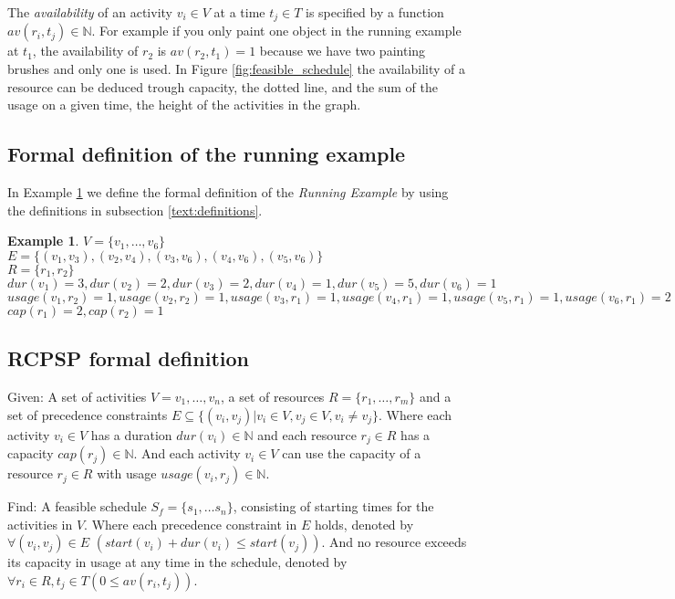\documentclass{article}
\theoremstyle{definition}
\newtheorem{example}{Example}[section]
\newcommand{\av}[2]{\ensuremath{av(r_{#1}, t_{#2})}} %
\newcommand{\capa}[1]{\ensuremath{cap(r_{#1})}} %
\newcommand{\dur}[1]{\ensuremath{dur(v_{#1})}} %
\newcommand{\usage}[2]{\ensuremath{usage(v_{#1}, r_{#2})}} %
\newcommand{\start}[1]{\ensuremath{start(v_{#1})}} %
\newenvironment{definition}[1][Definition]{\begin{trivlist}
\item[\hskip \labelsep {\bfseries #1}]}{\end{trivlist}}
\begin{document}
The \emph{availability} of an activity $v_i \in V$ at a time $t_j \in T$ is specified by a function $\av{i}{j} \in \mathbb{N}$.
For example if you only paint one object in the running example at $t_1$, the availability of $r_2$ is $\av{2}{1} = 1$ because we have two painting brushes and only one is used.
In Figure \ref{fig:feasible_schedule} the availability of a resource can be deduced trough capacity, the dotted line, and the sum of the usage on a given time, the height of the activities in the graph. 

\subsection{Formal definition of the running example}

In Example \ref{exmp:running} we define the formal definition of the \emph{Running Example} by using the definitions in subsection \ref{text:definitions}.
\begin{example}
\label{exmp:running}
$V = \{v_1, \ldots, v_6\}$\\
$E = \{(v_1, v_3), (v_2, v_4), (v_3, v_6), (v_4, v_6), (v_5, v_6)\}$\\
$R = \{r_1, r_2\}$\\
$\dur{1} = 3, \dur{2} = 2, \dur{3} = 2, \dur{4} = 1, \dur{5} = 5, \dur{6} = 1$\\
$\usage{1}{2} = 1, \usage{2}{2} = 1, \usage{3}{1} = 1, \usage{4}{1} = 1, \usage{5}{1} = 1, \usage{6}{1} = 2$\\
$\capa{1} = 2, \capa{2} = 1$
\end{example}


\subsection{RCPSP formal definition}

\begin{definition}
Given:
A set of activities $V = v_1, \ldots, v_n$, a set of resources $R = \{r_1, \ldots, r_m\}$ and a set of precedence constraints $E \subseteq  \{(v_i, v_j) | v_i \in V, v_j \in V, v_i \neq v_j\}$.
Where each activity $v_i \in V$ has a duration $\dur{i} \in \mathbb{N}$ and each resource $r_j \in R$ has a capacity $\capa{j} \in \mathbb{N}$. 
And each activity $v_i \in V$ can use the capacity of a resource $r_j \in R$ with usage $\usage{i}{j} \in \mathbb{N}$.

Find:
A feasible schedule $S_f = \{s_1, \ldots s_n\}$, consisting of starting times for the activities in $V$.
Where each precedence constraint in $E$ holds, denoted by $\forall (v_i, v_j) \in E$ $(\start{i} + \dur{i} \leq \start{j})$.
And no resource exceeds its capacity in usage at any time in the schedule, denoted by $\forall r_i \in R, t_j \in T (0 \leq \av{i}{j})$.
\end{definition}
\end{document}
